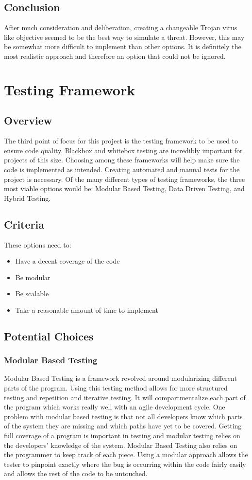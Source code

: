 \documentclass[onecolumn, draftclsnofoot,10pt, compsoc]{IEEEtran}
\begin{document}
\subsection{Conclusion}
After much consideration and deliberation, creating a changeable Trojan virus like objective seemed to be the best way to simulate a threat. However, this may be somewhat more difficult to implement than other options. It is definitely the most realistic approach and therefore an option that could not be ignored.

\section{Testing Framework}
\subsection{Overview}
The third point of focus for this project is the testing framework to be used to ensure code quality. Blackbox and whitebox testing are incredibly important for projects of this size. Choosing among these frameworks will help make sure the code is implemented as intended. Creating automated and manual tests for the project is necessary. Of the many different types of testing frameworks, the three most viable options would be: Modular Based Testing, Data Driven Testing, and Hybrid Testing. 
\subsection{Criteria}
These options need to:
\begin{itemize}
	\item Have a decent coverage of the code
    \item Be modular
    \item Be scalable
    \item Take a reasonable amount of time to implement
\end{itemize}

\subsection{Potential Choices}
\subsubsection{Modular Based Testing}
Modular Based Testing is a framework revolved around modularizing different parts of the program. Using this testing method allows for more structured testing and repetition and iterative testing. It will compartmentalize each part of the program which works really well with an agile development cycle. One problem with modular based testing is that not all developers know which parts of the system they are missing and which paths have yet to be covered. Getting full coverage of a program is important in testing and modular testing relies on the developers' knowledge of the system. Modular Based Testing also relies on the programmer to keep track of each piece. Using a modular approach allows the tester to pinpoint exactly where the bug is occurring within the code fairly easily and allows the rest of the code to be untouched.
\end{document}

